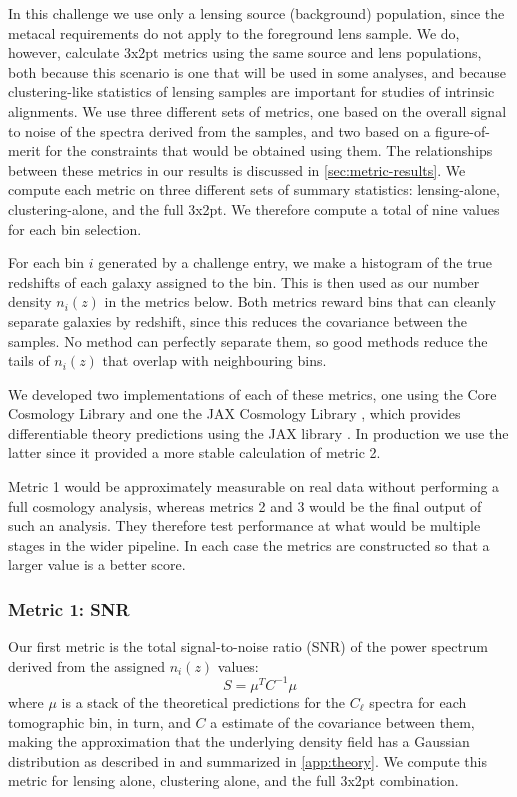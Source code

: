 \documentclass[twocolumn,twocolappendix]{aastex63}
\begin{document}
In this challenge we use only a lensing source (background) population, since the metacal requirements
do not apply to the foreground lens sample. We do, however, calculate 3x2pt metrics using the
same source and lens populations, both because this scenario is one that will be used in some analyses,
and because clustering-like statistics of lensing samples are important for studies of intrinsic
alignments. We use three different sets of metrics, one based on the overall signal to noise of the spectra 
derived from the samples, and two based on a figure-of-merit for the constraints that would be obtained 
using them. The relationships between these metrics in our results is discussed in \autoref{sec:metric-results}.
We compute each metric on three different sets of summary statistics: lensing-alone, clustering-alone,
and the full 3x2pt. We therefore compute a total of nine values for each bin selection.

For each bin $i$ generated by a challenge entry, we make a histogram of the true redshifts 
of each galaxy assigned to the bin.  This is then used as our number density $n_i(z)$ in the metrics 
below. Both metrics reward bins that can
cleanly separate galaxies by redshift, since this reduces the covariance between the samples. No
method can perfectly separate them, so good methods reduce the tails of $n_i(z)$ that overlap with 
neighbouring bins.

We developed two implementations of each of these metrics, one using the Core Cosmology Library 
\citep{ccl} and one the JAX Cosmology Library \citep{jax-cosmo}, which provides differentiable theory 
predictions using the JAX library \citep{jax}.  In production we use the latter since it provided a
more stable calculation of metric 2.

Metric 1 would be approximately measurable on real data without performing a full cosmology analysis,
whereas metrics 2 and 3 would be the final output of such an analysis.  They therefore test performance at what
would be multiple stages in the wider pipeline. In each case the metrics are constructed so that a larger
value is a better score.

\subsubsection{Metric 1: SNR}

Our first metric is the total signal-to-noise ratio (SNR) of the power spectrum derived from the assigned
$n_i(z)$ values:
\begin{equation}
    S = \mu^{T} C^{-1} \mu
\label{eq:snr}
\end{equation}
where $\mu$ is a stack of the theoretical predictions for the $C_\ell$ spectra for each tomographic 
bin, in turn, and $C$ a estimate of the covariance between them, making the approximation that the underlying density field has a Gaussian distribution as described in
\citet{takada_jain} and summarized in \autoref{app:theory}.   We compute this metric for lensing alone, clustering alone, and the full 3x2pt combination.
\end{document}

